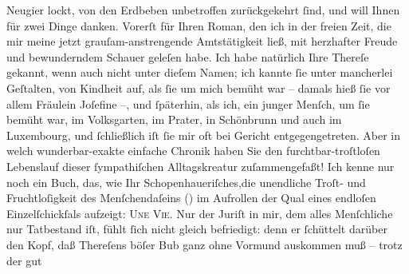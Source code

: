 \begin{ledgroupsized}[t]{13cm}
               Neugier lockt, von den Erdbeben unbetroffen zurückgekehrt ſind, und will Ihnen für
               zwei Dinge danken.\pend
           \pstart
           Vorerſt für Ihren Roman, den
               ich in der freien Zeit, die mir meine jetzt grauſam-anstrengende Amtstätigkeit ließ,
               mit herzhafter Freude und bewunderndem Schauer geleſen habe. {\pb}Ich habe natürlich Ihre Thereſe gekannt,
               wenn auch nicht unter dieſem Namen; ich kannte ſie unter mancherlei Geſtalten, von
               Kindheit auf, als ſie um mich bemüht war – damals hieß ſie vor allem Fräulein
               Joſefine –, und ſpäterhin, als ich, ein junger Menſch, um ſie bemüht war, im Volksgarten, im Prater, in Schönbrunn und auch im Luxembourg, und ſchließlich iſt ſie mir oft bei
               Gericht entgegengetreten. Aber in welch wunderbar-exakte einfache Chronik haben Sie
               den furchtbar-troſtloſen Lebenslauf dieser ſympathiſchen Alltagskreatur
               zuſammengefaßt! Ich kenne nur noch ein Buch, das, wie Ihr Schopenhaueriſches,die unendliche Troſt- und Fruchtloſigkeit
               des Menſchendaſeins (\textsc{\label{K_L02500-1v}\label{K_L02500-1h}}) im Aufrollen der Qual eines endloſen Einzelſchickſals aufzeigt: \textsc{Une Vie}.\pend
           \pstart
           {\pb}Nur der Juriſt in mir, dem alles
               Menſchliche nur Tatbestand iſt, fühlt ſich nicht gleich befriedigt: denn er ſchüttelt
               darüber den Kopf, daß Thereſens böſer Bub ganz ohne Vormund auskommen muß – trotz der gut

\end{ledgroupsized}
